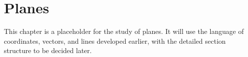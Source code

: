 \chapter{Planes}

This chapter is a placeholder for the study of planes. It will use the language of coordinates, vectors, and lines developed earlier, with the detailed section structure to be decided later.
